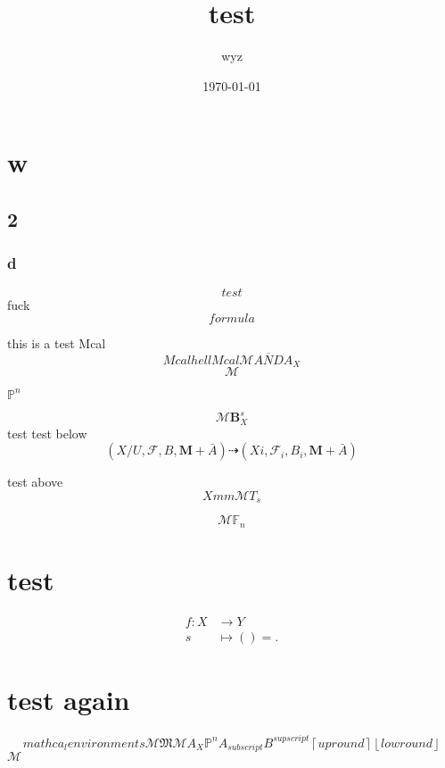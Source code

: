 \documentclass{article}
\title{test}
\author{wyz}
\date{\today}
\begin{document}
\maketitle
\section{w}
\subsection{2}

\subsubsection{d}
\begin{equation}
  test 
\end{equation}
fuck
\[
	formula
\]

\newpage

this is a test
Mcal
\begin{equation}
	Mcal hell Mcal
	\mathcal{M}  \overline{AND} A_{X}
\end{equation}
\[
	\mathcal{M}
\]

$\mathbb{P}^{n}$

\[
	\mathcal{M} \mathbf{B}_{X}^{s}
\]
test
test below
\[
	(X/U,\mathcal{F},B,\mathbf{M}+ \bar{A})  \dashrightarrow (Xi,\mathcal{F}_{i},B_{i},\mathbf{M}+\bar{A})
\]

test above
\[
	Xmm  \mathcal{M} T_{s}
\]

\[
	\mathcal{M} \mathbb{F}_{n}
\]

\section{test}
\begin{center}
	\begin{align*}
		f : X & \longrightarrow Y \\
		s     & \longmapsto () =
		.\end{align*}
\end{center}

\section{test again}
\[
  mathca_{l} environments  \mathcal{M} \mathfrak{M} \mathscr{M} A_{X} \mathbb{P}^{n} A_{subscript} B^{supscript} \left\lceil up round \right\rceil \left\lfloor low round \right\rfloor 
\] $\mathcal{M}$
\end{document}
